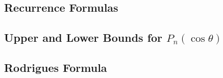 \documentclass[12pt,a4paper]{article}
\begin{document}
\subsection{Recurrence Formulas}
















\subsection{Upper and Lower Bounds for $P_n (\cos \theta)$}











\subsection{Rodrigues Formula}
\end{document}
